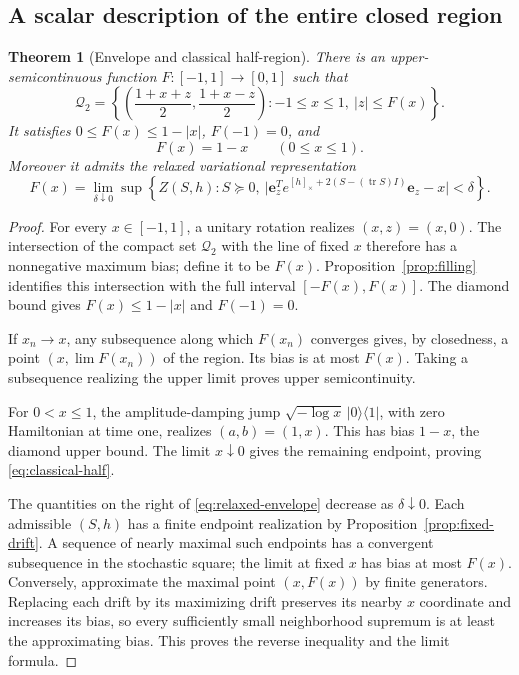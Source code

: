 \documentclass[11pt]{article}
\newtheorem{theorem}{Theorem}[section]
\theoremstyle{definition}
\theoremstyle{remark}
\DeclareMathOperator{\tr}{tr}
\newcommand{\Q}{\mathcal Q_2}
\newcommand{\ee}{\mathbf e_z}
\newcommand{\PSD}{\succeq0}
\begin{document}
\subsection{A scalar description of the entire closed region}
\begin{theorem}[Envelope and classical half-region]\label{thm:envelope}
There is an upper-semicontinuous function \(F:[-1,1]\to[0,1]\) such that
\begin{equation}\label{eq:envelope}
 \Q=\left\{\left(\frac{1+x+z}{2},\frac{1+x-z}{2}\right):
 -1\leq x\leq1,\ |z|\leq F(x)\right\}.
\end{equation}
It satisfies \(0\leq F(x)\leq1-|x|\), \(F(-1)=0\), and
\begin{equation}\label{eq:classical-half}
 F(x)=1-x\qquad(0\leq x\leq1).
\end{equation}
Moreover it admits the relaxed variational representation
\begin{equation}\label{eq:relaxed-envelope}
 F(x)=\lim_{\delta\downarrow0}\sup\left\{
 Z(S,h):S\PSD,\ \big|\ee^Te^{[h]_\times+2(S-(\tr S)I)}\ee-x\big|<\delta
 \right\}.
\end{equation}
\end{theorem}
\begin{proof}
For every \(x\in[-1,1]\), a unitary rotation realizes \((x,z)=(x,0)\). The intersection of the compact set \(\Q\) with the line of fixed \(x\) therefore has a nonnegative maximum bias; define it to be \(F(x)\). Proposition~\ref{prop:filling} identifies this intersection with the full interval \([-F(x),F(x)]\). The diamond bound gives \(F(x)\leq1-|x|\) and \(F(-1)=0\).

If \(x_n\to x\), any subsequence along which \(F(x_n)\) converges gives, by closedness, a point \((x,\lim F(x_n))\) of the region. Its bias is at most \(F(x)\). Taking a subsequence realizing the upper limit proves upper semicontinuity.

For \(0<x\leq1\), the amplitude-damping jump \(\sqrt{-\log x}\,|0\rangle\langle1|\), with zero Hamiltonian at time one, realizes \((a,b)=(1,x)\). This has bias \(1-x\), the diamond upper bound. The limit \(x\downarrow0\) gives the remaining endpoint, proving \eqref{eq:classical-half}.

The quantities on the right of \eqref{eq:relaxed-envelope} decrease as \(\delta\downarrow0\). Each admissible \((S,h)\) has a finite endpoint realization by Proposition~\ref{prop:fixed-drift}. A sequence of nearly maximal such endpoints has a convergent subsequence in the stochastic square; the limit at fixed \(x\) has bias at most \(F(x)\). Conversely, approximate the maximal point \((x,F(x))\) by finite generators. Replacing each drift by its maximizing drift preserves its nearby \(x\) coordinate and increases its bias, so every sufficiently small neighborhood supremum is at least the approximating bias. This proves the reverse inequality and the limit formula.
\end{proof}
\end{document}
